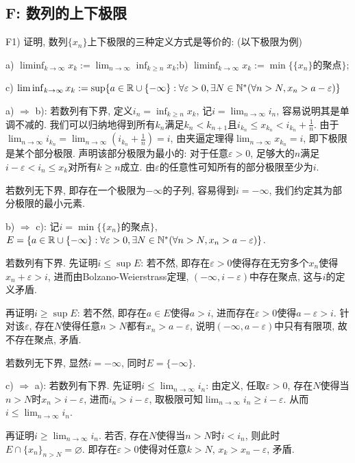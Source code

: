 \subsection*{F: 数列的上下极限}

F1) 证明, 数列$\{ x_n \}$上下极限的三种定义方式是等价的: (以下极限为例)

a) $\liminf_{k\to \infty} x_k:=\lim_{n\to \infty} \inf_{k \geq n} x_k$;\qquad b) $\liminf_{k\to \infty} x_k:= \min  \{\{ x_n \}\text{的聚点} \}$; 

c) $\liminf_{k\to \infty} x_k:= \sup \{ a\in \mathbb{R} \cup \{ -\infty \}: \forall \varepsilon >0, \exists N \in \mathbb{N}^{*} (\forall n>N, x_n>a-\varepsilon ) \}$

\begin{solution}
	a) $\Rightarrow$ b): 若数列有下界, 定义$i_n=\inf_{k\geq n}x_k$, 记$i=\lim_{n\to \infty} i_{n}$, 容易说明其是单调不减的. 我们可以归纳地得到所有$k_n$满足$k_n<k_{n+1}$且$i_{k_n} \leq x_{k_n} < i_{k_n}+\frac{1}{n}$. 由于$\lim_{n\to \infty} i_{k_n} = \lim_{n\to \infty} (i_{k_n}+\frac{1}{n} ) = i$, 由夹逼定理得$\lim_{n\to \infty} x_{k_n}=i$, 即下极限是某个部分极限. 声明该部分极限为最小的: 对于任意$\varepsilon >0$, 足够大的$n$满足$i-\varepsilon < i_n \leq x_k$对所有$k \geq n$成立. 由$\varepsilon$的任意性可知所有的部分极限至少为$i$. 
	
	若数列无下界, 即存在一个极限为$-\infty$的子列, 容易得到$i=-\infty$, 我们约定其为部分极限的最小元素. 
	
	b) $\Rightarrow$ c): 记$i=\min  \{\{ x_n \}\text{的聚点} \}$, $E = \{ a\in \mathbb{R} \cup \{ -\infty \}: \forall \varepsilon >0, \exists N \in \mathbb{N}^{*} (\forall n>N, x_n>a-\varepsilon ) \}$. 
	
	若数列有下界. 先证明$i \leq \sup E$: 若不然, 即存在$\varepsilon >0$使得存在无穷多个$x_n$使得$x_n+\varepsilon >i$, 进而由Bolzano-Weierstrass定理, $(-\infty ,i-\varepsilon)$中存在聚点, 这与$i$的定义矛盾. 
	
	再证明$i \geq \sup E$: 若不然, 即存在$a \in E$使得$a>i$, 进而存在$\varepsilon >0$使得$a-\varepsilon >i$. 针对该$\varepsilon$, 存在$N$使得任意$n>N$都有$x_n>a-\varepsilon$, 说明$(-\infty ,a-\varepsilon)$中只有有限项, 故不存在聚点, 矛盾. 
	
	若数列无下界, 显然$i=-\infty$, 同时$E=\{ -\infty \}$. 
	
	c) $\Rightarrow$ a): 若数列有下界. 先证明$i \leq \lim_{n\to \infty} i_n$: 由定义, 任取$\varepsilon >0$, 存在$N$使得当$n>N$时$x_n > i-\varepsilon$, 进而$i_n > i-\varepsilon$, 取极限可知$\lim_{n\to \infty} i_n \geq i-\varepsilon$. 从而$i \leq \lim_{n\to \infty} i_n$. 
	
	再证明$i \geq \lim_{n\to \infty} i_n$. 若否, 存在$N$使得当$n>N$时$i<i_n$, 则此时$E \cap \{ x_n \}_{n>N} = \varnothing$. 即存在$\varepsilon >0$使得对任意$k>N$, $x_k > x_n-\varepsilon$, 矛盾. 
\end{solution}


